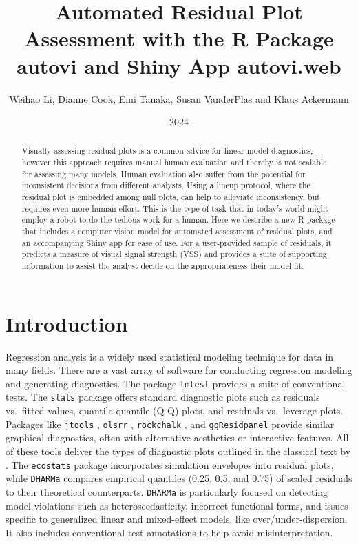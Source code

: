 \documentclass[
doublespace,
  times]{anzsauth}
\title{Automated Residual Plot Assessment with the R Package autovi and
Shiny App autovi.web}
\author{
Weihao Li\addressnum{1},
Dianne Cook\addressnum{1},
Emi Tanaka\addressnum{2},
Susan VanderPlas\addressnum{3} and
Klaus Ackermann\addressnum{1}
}
\affiliation{
Monash University,
The Australian National University and
University of Nebraska
}
\date{2024}
\begin{document}
\begin{abstract}
Visually assessing residual plots is a common advice for linear model
diagnostics, however this approach requires manual human evaluation and
thereby is not scalable for assessing many models. Human evaluation also
suffer from the potential for inconsistent decisions from different
analysts. Using a lineup protocol, where the residual plot is embedded
among null plots, can help to alleviate inconsistency, but requires even
more human effort. This is the type of task that in today's world might
employ a robot to do the tedious work for a human. Here we describe a
new R package that includes a computer vision model for automated
assessment of residual plots, and an accompanying Shiny app for ease of
use. For a user-provided sample of residuals, it predicts a measure of
visual signal strength (VSS) and provides a suite of supporting
information to assist the analyst decide on the appropriateness their
model fit.
\end{abstract}

          

\maketitle


\section{Introduction}\label{sec-autovi-introduction}

Regression analysis is a widely used statistical modeling technique for
data in many fields. There are a vast array of software for conducting
regression modeling and generating diagnostics. The package
\texttt{lmtest} \citep{lmtest} provides a suite of conventional tests.
The \texttt{stats} package \citep{stats} offers standard diagnostic
plots such as residuals vs.~fitted values, quantile-quantile (Q-Q)
plots, and residuals vs.~leverage plots. Packages like \texttt{jtools}
\citep{jtools}, \texttt{olsrr} \citep{olsrr}, \texttt{rockchalk}
\citep{rockchalk}, and \texttt{ggResidpanel} \citep{ggresidpanel}
provide similar graphical diagnostics, often with alternative aesthetics
or interactive features. All of these tools deliver the types of
diagnostic plots outlined in the classical text by
\citet{cook1982residuals}. The \texttt{ecostats} package
\citep{warton_global_2023} incorporates simulation envelopes into
residual plots, while \texttt{DHARMa} \citep{dharma} compares empirical
quantiles (0.25, 0.5, and 0.75) of scaled residuals to their theoretical
counterparts. \texttt{DHARMa} is particularly focused on detecting model
violations such as heteroscedasticity, incorrect functional forms, and
issues specific to generalized linear and mixed-effect models, like
over/under-dispersion. It also includes conventional test annotations to
help avoid misinterpretation.
\end{document}

